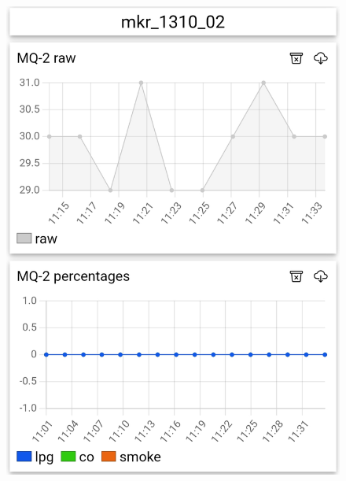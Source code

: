 \documentclass{beamer}
\begin{document}
\begin{frame}
\begin{columns}
\begin{column}{0.5\textwidth}
\begin{figure}
                \includegraphics[width=\textwidth]{images/iotpanel_2.png}
            \end{figure}
        \end{column}
    \end{columns}
\end{frame}
\end{document}

